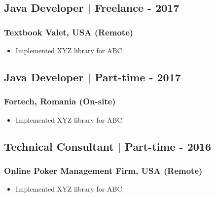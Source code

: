 \documentclass[11pt]{article}
\begin{document}
    \subsection{Java Developer | Freelance \hfill {} - 2017}
    \subsubsection{Textbook Valet, USA (Remote)}
    \begin{itemize}
        \item[\checkmark]  Implemented XYZ library for ABC.
    \end{itemize}
    
    \subsection{Java Developer | Part-time \hfill {} - 2017}
    \subsubsection{Fortech, Romania (On-site)}
    \begin{itemize}
        \item[\checkmark]  Implemented XYZ library for ABC.
    \end{itemize}
    
    \subsection{Technical Consultant | Part-time \hfill {} - 2016}
    \subsubsection{Online Poker Management Firm, USA (Remote)}
    \begin{itemize}
        \item[\checkmark]  Implemented XYZ library for ABC.
    \end{itemize}
\end{document}
